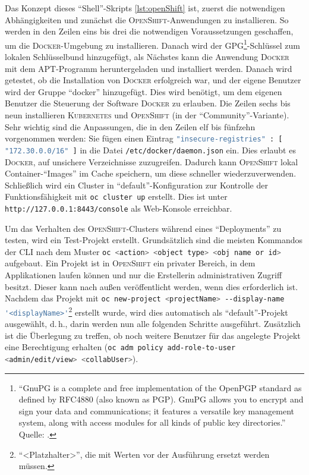 Das Konzept dieses \enquote{Shell}-Skripts \vref{lst:openShift} ist, zuerst die notwendigen Abhängigkeiten und zunächst die \textsc{OpenShift}-Anwendungen zu installieren. So werden in den Zeilen eins bis drei die notwendigen Voraussetzungen geschaffen, um die \textsc{Docker}-Umgebung zu installieren. Danach wird der \textsc{GPG}\footnote{\enquote{GnuPG is a complete and free implementation of the OpenPGP standard as defined by RFC4880 (also known as PGP). GnuPG allows you to encrypt and sign your data and communications; it features a versatile key management system, along with access modules for all kinds of public key directories.} Quelle: \cite{the_people_of_the_gnupg_project_gnu_2020}.}-Schlüssel zum lokalen Schlüsselbund hinzugefügt, als Nächstes kann die Anwendung \textsc{Docker} mit dem \ac{APT}-Programm heruntergeladen und installiert werden. Danach wird getestet, ob die Installation von \textsc{Docker} erfolgreich war, und der eigene Benutzer wird der Gruppe \enquote{docker} hinzugefügt. Dies wird benötigt, um dem eigenen Benutzer die Steuerung der Software \textsc{Docker} zu erlauben. Die Zeilen sechs bis neun installieren \textsc{Kubernetes} und \textsc{OpenShift} (in der \enquote{Community}-Variante). Sehr wichtig sind die Anpassungen, die in den Zeilen elf bis fünfzehn vorgenommen werden: Sie fügen einen Eintrag \lstinline[language=bash]|"insecure-registries" : [ "172.30.0.0/16" ]| in die Datei \lstinline[language=bash]|/etc/docker/daemon.json| ein. Dies erlaubt es \textsc{Docker}, auf unsichere Verzeichnisse zuzugreifen. Dadurch kann \textsc{OpenShift} lokal Container-\enquote{Images} im Cache speichern, um diese schneller wiederzuverwenden. Schließlich wird ein Cluster in \enquote{default}-Konfiguration zur Kontrolle der Funktionsfähigkeit mit \lstinline[language=bash]|oc cluster up| erstellt. Dies ist unter \lstinline[language=HTML, breaklines=true]|http://127.0.0.1:8443/console| als Web-Konsole erreichbar.
\par
Um das Verhalten des \textsc{OpenShift}-Clusters während eines \enquote{Deployments} zu testen, wird ein Test-Projekt erstellt. Grundsätzlich sind die meisten Kommandos der \ac{CLI} nach dem Muster \lstinline[language=sh]|oc <action> <object type> <obj name or id>|\autocite[vgl.][]{red_hat_inc_cli_2020} aufgebaut. Ein Projekt ist in \textsc{OpenShift} ein privater Bereich, in dem Applikationen laufen können und nur die Erstellerin administrativen Zugriff besitzt. Dieser kann nach außen veröffentlicht werden, wenn dies erforderlich ist. Nachdem das Projekt mit \lstinline[language=bash]|oc new-project <projectName> --display-name '<displayName>'|\footnote{\enquote{<Platzhalter>}, die mit Werten vor der Ausführung ersetzt werden müssen.} erstellt wurde, \newline wird dies automatisch als \enquote{default}-Projekt ausgewählt, d.\,h., darin werden nun alle folgenden Schritte ausgeführt. Zusätzlich ist die Überlegung zu treffen, ob noch weitere Benutzer für das angelegte Projekt eine Berechtigung erhalten (\lstinline[language=bash]|oc adm policy add-role-to-user <admin/edit/view> <collabUser>|). 
